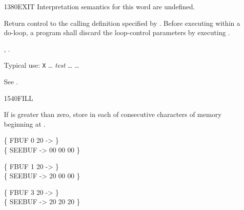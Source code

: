 \begin{worddef}{1380}{EXIT}
\interpret
	Interpretation semantics for this word are undefined.

\execute
	\stack{}{}

	Return control to the calling definition specified by
	. Before executing  within a
	do-loop, a program shall discard the loop-control parameters
	by executing .

\see {},
	.

	\begin{defer}
	\rationale %
		Typical use:
			\word{:} \texttt{X} {\ldots}
				\emph{test} 
				{\ldots}  
			{\ldots} \word{;}

	\testing*
		See .
	\end{defer}
\end{worddef}


\begin{worddef}{1540}{FILL}
\item {}

	If  is greater than zero, store  in each of
	 consecutive characters of memory beginning at
	\param{c-addr}.

	\begin{defer}
	\testing
		\{ FBUF 0 20  -> \} \\
		\{ SEEBUF -> 00 00 00 \}

		\{ FBUF 1 20  -> \} \\
		\{ SEEBUF -> 20 00 00 \}

		\{ FBUF 3 20  -> \} \\
		\{ SEEBUF -> 20 20 20 \}
	\end{defer}
\end{worddef}


